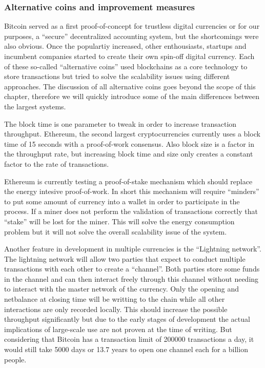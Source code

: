 \subsubsection{Alternative coins and improvement measures}
Bitcoin served as a first proof-of-concept for trustless digital currencies or for our purposes, a
``secure'' decentralized accounting system, but the shortcomings were also obvious. Once the 
populartiy increased, other enthousiasts, startups and incumbent companies started to create their 
own spin-off digital currency. Each of these so-called ``alternative coins'' used blockchains as 
a core technology to store transactions but tried to solve the scalability issues using different 
approaches. The discussion of all alternative coins goes beyond the scope of this chapter, therefore
we will quickly introduce some of the main differences between the largest systems. 

The block time is one parameter to tweak in order to increase transaction throughput. Ethereum, the
second largest cryptocurrencies currently uses a block time of 15 seconds with a proof-of-work 
consensus. Also block size is a factor in the throughput rate, but increasing block time and size 
only creates a constant factor to the rate of transactions.

Ethereum is currently testing a proof-of-stake mechanism which should replace the energy intesive 
proof-of-work. In short this mechanism will require ``minders'' to put some amount of currency into
a wallet in order to participate in the process. If a miner does not perform the validation of 
transactions correctly that ``stake'' will be lost for the miner. This will solve the energy 
consumption problem but it will not solve the overall scalability issue of the system. 

Another feature in development in multiple currencies is the ``Lightning network''. The lightning 
network will allow two parties that expect to conduct multiple transactions with each other to 
create a ``channel''. Both parties store some funds in the channel and can then interact freely 
through this channel without needing to interact with the master network of the currency. Only the
opening and netbalance at closing time will be writting to the chain while all other interactions 
are only recorded locally. This should increase the possible throughput significantly but due to the
early stages of development the actual implications of large-scale use are not proven at the time of
writing. But considering that Bitcoin has a transaction limit of 200000 transactions a day, it would 
still take 5000 days or 13.7 years to open one channel each for a billion people.

